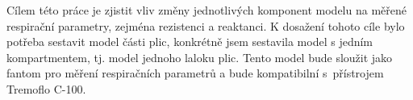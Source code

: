 Cílem této práce je zjistit vliv změny jednotlivých komponent modelu na měřené respirační parametry, zejména rezistenci a reaktanci. 
K dosažení tohoto cíle bylo potřeba sestavit model části plic, konkrétně jsem sestavila model s jedním kompartmentem, tj. model jednoho laloku plic. Tento model bude sloužit jako fantom pro měření respiračních parametrů a bude kompatibilní s~přístrojem Tremoflo C-100.
